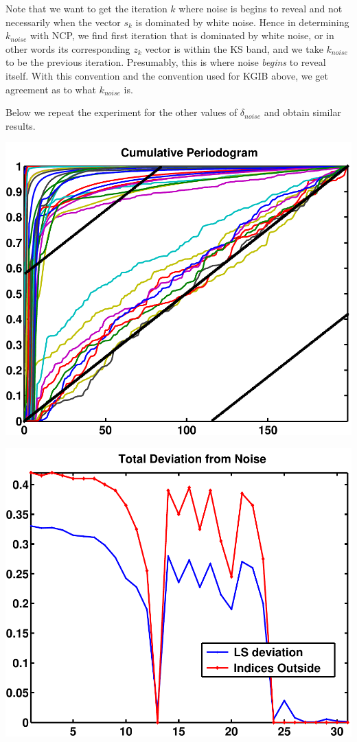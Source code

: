 \documentclass[11pt]{amsart}
\begin{document}
Note that we want to get the iteration $k$ where noise is begins to reveal and not 
necessarily when the vector $s_k$ is dominated by white noise. Hence in determining
$k_{noise}$ with NCP, we find first iteration that is dominated by white noise, or 
in other words its corresponding $z_k$ vector is within the KS band, and we take 
$k_{noise}$ to be the previous iteration. Presumably, this is where noise {\it begins}
to reveal itself. With this convention and the convention used for KGIB above, we get 
agreement as to what $k_{noise}$ is.

Below we repeat the experiment for the other values of $\delta_{noise}$ and obtain
similar results. 

	\vspace{5mm}
	\begin{minipage}[t]{0.5\textwidth}
	
		\includegraphics[width=.95\linewidth]{figures/run2/cum_per} 
   
	\end{minipage}
	\begin{minipage}[t]{0.5\textwidth}
	
		\includegraphics[width=.95\linewidth]{figures/run2/total_deviation} 
   
	\end{minipage}
\end{document}
